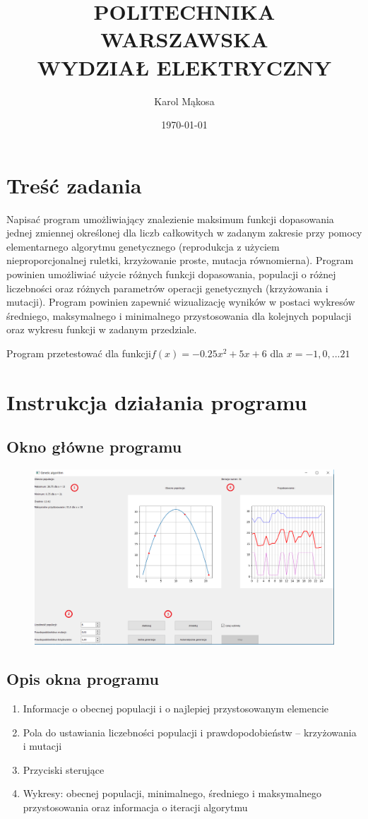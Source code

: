 \documentclass[a4paper,11pt]{article}
\title{POLITECHNIKA WARSZAWSKA \\ WYDZIAŁ ELEKTRYCZNY \\}
\author{Karol Mąkosa}
\date{\today}
\begin{document}
	\thispagestyle{empty}
	\maketitle
	\date{}
	\section{Treść zadania}
	Napisać program umożliwiający znalezienie maksimum funkcji dopasowania jednej 
	zmiennej określonej dla liczb całkowitych w zadanym zakresie przy pomocy 
	elementarnego algorytmu genetycznego (reprodukcja z użyciem nieproporcjonalnej 
	ruletki, krzyżowanie proste, mutacja równomierna). Program powinien umożliwiać 
	użycie różnych funkcji dopasowania, populacji o różnej liczebności oraz różnych 
	parametrów operacji genetycznych (krzyżowania i mutacji). Program powinien 
	zapewnić wizualizację wyników w postaci wykresów średniego, maksymalnego 
	i minimalnego przystosowania dla kolejnych populacji oraz wykresu funkcji 
	w zadanym przedziale. 
	
	Program przetestować dla funkcji$ f(x)= -0.25x^2 + 5x + 6 $ dla $x= -1, 0, ... 21 $

	\section{Instrukcja działania programu}
		\subsection{Okno główne programu}
			\begin{figure}[H]
				\centering
				\includegraphics[scale=0.55]{okno.png}
			\end{figure}
		\newpage
		\subsection{Opis okna programu}
				\begin{enumerate}
					\item Informacje o obecnej populacji i o najlepiej przystosowanym elemencie
					\item Pola do ustawiania liczebności populacji i prawdopodobieństw -- krzyżowania i mutacji
					\item Przyciski sterujące
					\item Wykresy: obecnej populacji, minimalnego, średniego i maksymalnego przystosowania oraz informacja o iteracji algorytmu
				\end{enumerate}	
\end{document}
